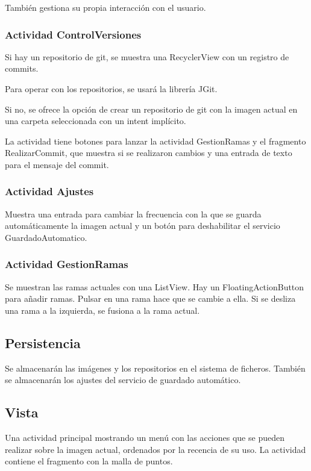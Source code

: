 \documentclass[a4paper,openright,12pt]{article}
\begin{document}
También gestiona su propia interacción con el usuario.

\subsubsection{Actividad ControlVersiones}
Si hay un repositorio de git, se muestra una RecyclerView con un registro de commits.

Para operar con los repositorios, se usará la librería JGit\cite{JGit}.

Si no, se ofrece la opción de crear un repositorio de git con la imagen actual en una carpeta seleccionada con un intent implícito.

La actividad tiene botones para lanzar la actividad GestionRamas y el fragmento RealizarCommit, que muestra si se realizaron cambios y una entrada de texto para el mensaje del commit.

\subsubsection{Actividad Ajustes}
Muestra una entrada para cambiar la frecuencia con la que se guarda automáticamente la imagen actual y un botón para deshabilitar el servicio GuardadoAutomatico.


\subsubsection{Actividad GestionRamas}
Se muestran las ramas actuales con una ListView. Hay un FloatingActionButton para añadir ramas. Pulsar en una rama hace que se cambie a ella. Si se desliza una rama a la izquierda, se fusiona a la rama actual.

\subsection{Persistencia}
Se almacenarán las imágenes y los repositorios en el sistema de ficheros.
También se almacenarán los ajustes del servicio de guardado automático.

\subsection{Vista}
Una actividad principal mostrando un menú con las acciones que se pueden realizar sobre la imagen actual, ordenados por la recencia de su uso. La actividad contiene el fragmento con la malla de puntos.
\end{document}
